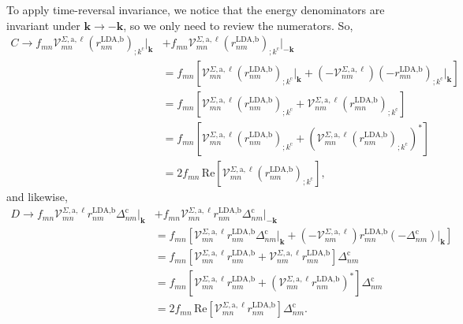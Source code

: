 To apply time-reversal invariance, we notice that the energy denominators are
invariant under $\mathbf{k}\rightarrow -\mathbf{k}$, so we only need to review
the numerators. So,
\begin{align}\label{ct}
C \rightarrow f_{mn}\mathcal{V}^{\Sigma,\text{a},\ell}_{mn}
    \left(r^{\text{LDA,b}}_{nm}\right)_{;k^{\text{c}}}\vert_{\mathbf{k}}
&+  f_{mn}\mathcal{V}^{\Sigma,\text{a},\ell}_{mn}
    \left(r^{\text{LDA,b}}_{nm}\right)_{;k^{\text{c}}}\vert_{-\mathbf{k}}
    \nonumber\\
&=  f_{mn}\left[\mathcal{V}^{\Sigma,\text{a},\ell}_{mn}
    \left(r^{\text{LDA,b}}_{nm}\right)_{;k^{\text{c}}}\vert_{\mathbf{k}} 
+   \left(-\mathcal{V}^{\Sigma,\text{a},\ell}_{nm}\right)
    \left(-r^{\text{LDA,b}}_{mn}\right)_{;k^{\text{c}}}\vert_{\mathbf{k}}\right]
    \nonumber\\
&= f_{mn}\left[\mathcal{V}^{\Sigma,\text{a},\ell}_{mn}
    \left(r^{\text{LDA,b}}_{nm}\right)_{;k^{\text{c}}}
+   \mathcal{V}^{\Sigma,\text{a},\ell}_{nm}
    \left(r^{\text{LDA,b}}_{mn}\right)_{;k^{\text{c}}}\right]\nonumber\\
&= f_{mn}\left[\mathcal{V}^{\Sigma,\text{a},\ell}_{mn} 
    \left(r^{\text{LDA,b}}_{nm}\right)_{;k^{\text{c}}}
+   \left(\mathcal{V}^{\Sigma,\text{a},\ell}_{mn}
    \left(r^{\text{LDA,b}}_{nm}\right)_{;k^{\text{c}}}\right)^{*}\right]
    \nonumber\\
&=  2f_{mn}\,\mathrm{Re}\left[\mathcal{V}^{\Sigma,\text{a},\ell}_{mn}
    \left(r^{\text{LDA,b}}_{nm}\right)_{;k^{\text{c}}}\right],
\end{align}
and likewise,
\begin{align}\label{dt}
D \rightarrow f_{mn}\mathcal{V}^{\Sigma,\text{a},\ell}_{mn}
    r^{\text{LDA,b}}_{nm}\Delta^{\text{c}}_{nm}\vert_{\mathbf{k}} 
&+  f_{mn}\mathcal{V}^{\Sigma,\text{a},\ell}_{mn}r^{\text{LDA,b}}_{nm}
    \Delta^{\text{c}}_{nm}\vert_{-\mathbf{k}}\nonumber\\
&=  f_{mn}\left[\mathcal{V}^{\Sigma,\text{a},\ell}_{mn}r^{\text{LDA,b}}_{nm}
    \Delta^{\text{c}}_{nm}\vert_{\mathbf{k}}
+   \left(-\mathcal{V}^{\Sigma,\text{a},\ell}_{nm}\right)r^{\text{LDA,b}}_{mn}
    \left(-\Delta^{\text{c}}_{nm}\right)\vert_{\mathbf{k}}\right]\nonumber\\
&=  f_{mn}\left[\mathcal{V}^{\Sigma,\text{a},\ell}_{mn}r^{\text{LDA,b}}_{nm}
+   \mathcal{V}^{\Sigma,\text{a},\ell}_{nm}r^{\text{LDA,b}}_{mn}\right]
    \Delta^{\text{c}}_{nm}\nonumber\\
&=  f_{mn}\left[\mathcal{V}^{\Sigma,\text{a},\ell}_{mn}r^{\text{LDA,b}}_{nm}
+   \left(\mathcal{V}^{\Sigma,\text{a},\ell}_{mn}
    r^{\text{LDA,b}}_{nm}\right)^{*}\right]\Delta^{\text{c}}_{nm}\nonumber\\
&=  2f_{mn}\,\mathrm{Re}\left[\mathcal{V}^{\Sigma,\text{a},\ell}_{mn}
    r^{\text{LDA,b}}_{nm}\right]\Delta^{\text{c}}_{nm}.
\end{align}

